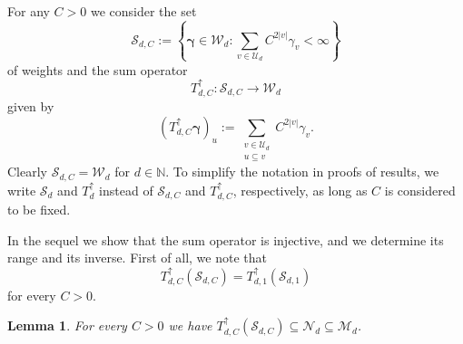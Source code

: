 \documentclass{article}
\newcommand{\N}  {{\mathbb N}}
\newcommand{\bg}{{\boldsymbol{\gamma}}}
\newcommand{\U}  {\mathcal{U}}
\newcommand{\W}  {\mathcal{W}}
\newcommand{\M}  {\mathcal{M}}
\newcommand{\mN}  {\mathcal{N}}
\newcommand{\SSS}{\mathcal{S}}
\newcommand{\up}{\uparrow}
\theoremstyle{plain}
\newtheorem{lemma}{Lemma}
\theoremstyle{definition}
\begin{document}
For any $C>0$ we consider the set
\[
\SSS_{d,C} := \left\{ \bg \in \W_d : 
\sum_{v \in \U_d} C^{2|v|} \gamma_v < \infty \right\}
\]
of weights and the sum operator 
\[
T^{\up}_{d,C} \colon \SSS_{d,C} \to \W_d
\]
given by
\[
\left(T^\up_{d,C} \bg\right)_u :=
\sum_{\substack{v\in \U_d \\ u\subseteq v}}
C^{2\left|v\right|}\gamma_v.
\]
Clearly $\SSS_{d,C} = \W_d$ for $d \in \N$.
To simplify the notation in proofs of results,
we write $\SSS_d$ and $T^\up_d$
instead of  $\SSS_{d,C}$ and $T^\up_{d,C}$, respectively, as long as
$C$ is considered to be fixed.

In the sequel we show that the sum operator is injective, and we
determine its range and
its inverse.
First of all, we note that
\begin{equation}\label{eq:C_OBdA_1}
T^\up_{d,C}(\SSS_{d,C}) = T^\up_{d,1}(\SSS_{d,1})
\end{equation}
for every $C > 0$.

\begin{lemma}\label{cmd:claim_iii_neu}
For every $C>0$ we have
$T^\up_{d,C}(\SSS_{d,C}) \subseteq \mN_d \subseteq \M_d$.
\end{lemma}
\end{document}
